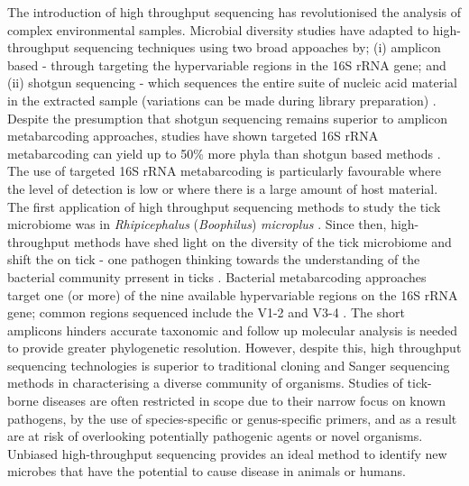 \documentclass[a4paper, nobind]{templates/ociamthesis}
\begin{document}
The introduction of high throughput sequencing has revolutionised the analysis of complex environmental samples.
Microbial diversity studies have adapted to high-throughput sequencing techniques using two broad appoaches by; (i) amplicon based - through targeting the hypervariable regions in the 16S rRNA gene; and (ii) shotgun sequencing - which sequences the entire suite of nucleic acid material in the extracted sample (variations can be made during library preparation) \autocite{liuPracticalGuideAmplicon2020,bhartiCurrentChallengesBestpractice2021}.
Despite the presumption that shotgun sequencing remains superior to amplicon metabarcoding approaches, studies have shown targeted 16S rRNA metabarcoding can yield up to 50\% more phyla than shotgun based methods \autocite{tesslerLargescaleDifferencesMicrobial2017}.
The use of targeted 16S rRNA metabarcoding is particularly favourable where the level of detection is low or where there is a large amount of host material.
The first application of high throughput sequencing methods to study the tick microbiome was in \emph{Rhipicephalus} (\emph{Boophilus}) \emph{microplus} \autocite{andreottiAssessmentBacterialDiversity2011}.
Since then, high-throughput methods have shed light on the diversity of the tick microbiome \autocite{greayRecentInsightsTick2018} and shift the on tick - one pathogen thinking towards the understanding of the bacterial community prresent in ticks \autocite{moutaillerCoinfectionTicksRule2016}.
Bacterial metabarcoding approaches target one (or more) of the nine available hypervariable regions on the 16S rRNA gene; common regions sequenced include the V1-2 and V3-4 \autocite{barbDevelopmentAnalysisPipeline2016,yangSensitivityCorrelationHypervariable2016,sperlingComparisonBacterial16S2017}.
The short amplicons hinders accurate taxonomic and follow up molecular analysis is needed to provide greater phylogenetic resolution.
However, despite this, high throughput sequencing technologies is superior to traditional cloning and Sanger sequencing methods in characterising a diverse community of organisms.
Studies of tick-borne diseases are often restricted in scope due to their narrow focus on known pathogens, by the use of species-specific or genus-specific primers, and as a result are at risk of overlooking potentially pathogenic agents or novel organisms.
Unbiased high-throughput sequencing provides an ideal method to identify new microbes that have the potential to cause disease in animals or humans.
\end{document}
